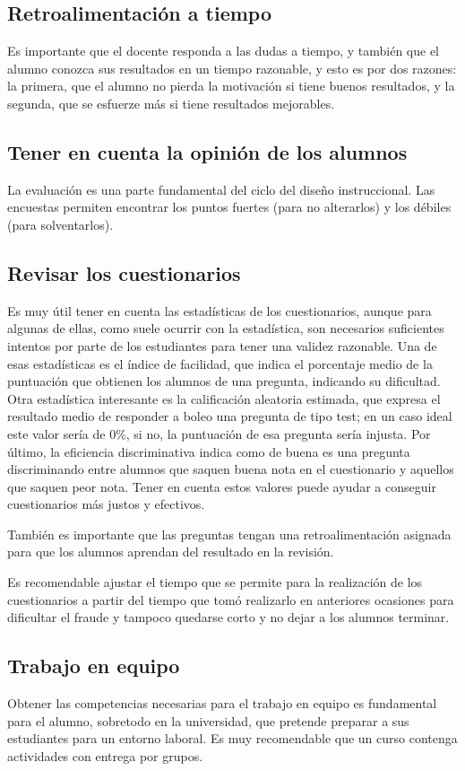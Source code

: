 \subsection{Retroalimentación a tiempo}
Es importante que el docente responda a las dudas a tiempo, y también que el alumno conozca sus resultados en un tiempo razonable, y esto es por dos razones: la primera, que el alumno no pierda la motivación si tiene buenos resultados, y la segunda, que se esfuerze más si tiene resultados mejorables.
\subsection{Tener en cuenta la opinión de los alumnos}
La evaluación es una parte fundamental del ciclo del diseño instruccional.
Las encuestas permiten encontrar los puntos fuertes (para no alterarlos) y los débiles (para solventarlos).

\subsection{Revisar los cuestionarios}
Es muy útil tener en cuenta las estadísticas de los cuestionarios, aunque para algunas de ellas, como suele ocurrir con la estadística, son necesarios suficientes intentos por parte de los estudiantes para tener una validez razonable. Una de esas estadísticas es el índice de facilidad, que indica el porcentaje medio de la puntuación que obtienen los alumnos de una pregunta, indicando su dificultad. Otra estadística interesante es la calificación aleatoria estimada, que expresa el resultado medio de responder a boleo una pregunta de tipo test; en un caso ideal este valor sería de 0\%, si no, la puntuación de esa pregunta sería injusta. Por último, la eficiencia discriminativa\cite{discrimination-2021} indica como de buena es una pregunta discriminando entre alumnos que saquen buena nota en el cuestionario y aquellos que saquen peor nota. Tener en cuenta estos valores puede ayudar a conseguir cuestionarios más justos y efectivos.

También es importante que las preguntas tengan una retroalimentación asignada para que los alumnos aprendan del resultado en la revisión.

Es recomendable ajustar el tiempo que se permite para la realización de los cuestionarios a partir del tiempo que tomó realizarlo en anteriores ocasiones para dificultar el fraude y tampoco quedarse corto y no dejar a los alumnos terminar.

\subsection{Trabajo en equipo}
Obtener las competencias necesarias para el trabajo en equipo es fundamental para el alumno, sobretodo en la universidad, que pretende preparar a sus estudiantes para un entorno laboral. Es muy recomendable que un curso contenga actividades con entrega por grupos.

